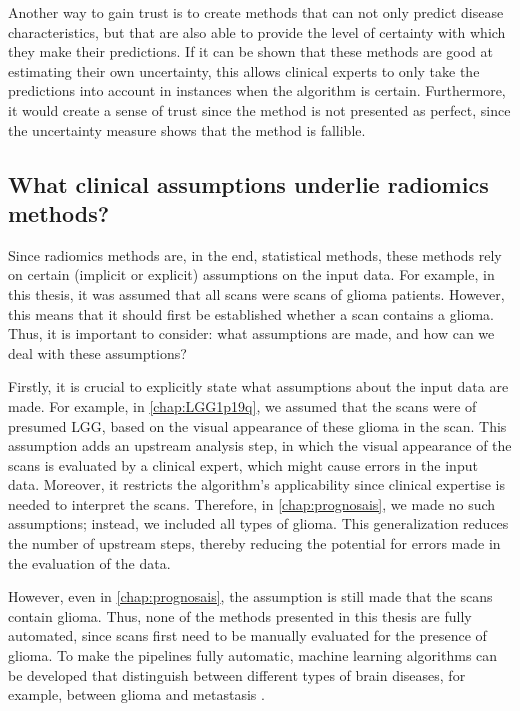 Another way to gain trust is to create methods that can not only predict disease characteristics, but that are also able to provide the level of certainty with which they make their predictions.
If it can be shown that these methods are good at estimating their own uncertainty, this allows clinical experts to only take the predictions into account in instances when the algorithm is certain.
Furthermore, it would create a sense of trust since the method is not presented as perfect, since the uncertainty measure shows that the method is fallible.

\subsection{What clinical assumptions underlie radiomics methods?}

Since radiomics methods are, in the end, statistical methods, these methods rely on certain (implicit or explicit) assumptions on the input data.
For example, in this thesis, it was assumed that all scans were scans of glioma patients.
However, this means that it should first be established whether a scan contains a glioma.
Thus, it is important to consider: what assumptions are made, and how can we deal with these assumptions?

Firstly, it is crucial to explicitly state what assumptions about the input data are made.
For example, in \cref{chap:LGG1p19q}, we assumed that the scans were of presumed \gls{LGG}, based on the visual appearance of these glioma in the scan.
This assumption adds an upstream analysis step, in which the visual appearance of the scans is evaluated by a clinical expert, which might cause errors in the input data.
Moreover, it restricts the algorithm's applicability since clinical expertise is needed to interpret the scans.
Therefore, in \cref{chap:prognosais}, we made no such assumptions; instead, we included all types of glioma.
This generalization reduces the number of upstream steps, thereby reducing the potential for errors made in the evaluation of the data.

However, even in \cref{chap:prognosais}, the assumption is still made that the scans contain glioma.
Thus, none of the methods presented in this thesis are fully automated, since scans first need to be manually evaluated for the presence of glioma.
To make the pipelines fully automatic, machine learning algorithms can be developed that distinguish between different types of brain diseases, for example, between glioma and metastasis \autocite{chen2019metastatic}.

